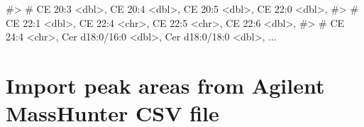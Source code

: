 \documentclass[
  letterpaper,
  DIV=11,
  numbers=noendperiod]{scrreprt}
\newenvironment{Shaded}{\begin{snugshade}}{\end{snugshade}}
\newcommand{\CommentTok}[1]{\textcolor[rgb]{0.37,0.37,0.37}{#1}}
\begin{document}
\begin{Shaded}
\begin{Highlighting}[]
\CommentTok{\#\textgreater{} \#   \textasciigrave{}CE 20:3\textasciigrave{} \textless{}dbl\textgreater{}, \textasciigrave{}CE 20:4\textasciigrave{} \textless{}dbl\textgreater{}, \textasciigrave{}CE 20:5\textasciigrave{} \textless{}dbl\textgreater{}, \textasciigrave{}CE 22:0\textasciigrave{} \textless{}dbl\textgreater{},}
\CommentTok{\#\textgreater{} \#   \textasciigrave{}CE 22:1\textasciigrave{} \textless{}dbl\textgreater{}, \textasciigrave{}CE 22:4\textasciigrave{} \textless{}chr\textgreater{}, \textasciigrave{}CE 22:5\textasciigrave{} \textless{}chr\textgreater{}, \textasciigrave{}CE 22:6\textasciigrave{} \textless{}dbl\textgreater{},}
\CommentTok{\#\textgreater{} \#   \textasciigrave{}CE 24:4\textasciigrave{} \textless{}chr\textgreater{}, \textasciigrave{}Cer d18:0/16:0\textasciigrave{} \textless{}dbl\textgreater{}, \textasciigrave{}Cer d18:0/18:0\textasciigrave{} \textless{}dbl\textgreater{}, ...}
\end{Highlighting}
\end{Shaded}

\hypertarget{import-peak-areas-from-agilent-masshunter-csv-file}{%
\section{Import peak areas from Agilent MassHunter CSV
file}\label{import-peak-areas-from-agilent-masshunter-csv-file}}
\end{document}
